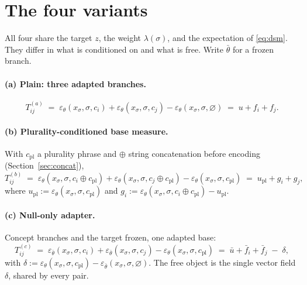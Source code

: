 \documentclass[11pt]{article}
\newcommand{\eps}{\varepsilon}
\newcommand{\epsth}{\eps_\theta}
\newcommand{\epsfr}{\eps_{\bar\theta}}
\newcommand{\xs}{x_\sigma}
\newcommand{\cnull}{\varnothing}
\newcommand{\cpl}{c_{\mathrm{pl}}}
\theoremstyle{plain}
\theoremstyle{remark}
\begin{document}
\section{The four variants}

All four share the target $z$, the weight $\lambda(\sigma)$, and the expectation of
\eqref{eq:dsm}. They differ in what is conditioned on and what is free. Write $\bar\theta$ for
a frozen branch.

\paragraph{(a) Plain: three adapted branches.}
\begin{equation}
  T^{(a)}_{ij} \;=\; \epsth(\xs,\sigma,c_i) + \epsth(\xs,\sigma,c_j) - \epsth(\xs,\sigma,\cnull)
  \;=\; u + f_i + f_j .
  \label{eq:va}
\end{equation}

\paragraph{(b) Plurality-conditioned base measure.}
With $\cpl$ a plurality phrase and $\oplus$ string concatenation before encoding
(Section~\ref{sec:concat}),
\begin{equation}
  T^{(b)}_{ij} \;=\; \epsth(\xs,\sigma,c_i \oplus \cpl) + \epsth(\xs,\sigma,c_j \oplus \cpl)
  - \epsth(\xs,\sigma,\cpl)
  \;=\; u_{\mathrm{pl}} + g_i + g_j ,
  \label{eq:vb}
\end{equation}
where $u_{\mathrm{pl}} := \epsth(\xs,\sigma,\cpl)$ and
$g_i := \epsth(\xs,\sigma,c_i \oplus \cpl) - u_{\mathrm{pl}}$.

\paragraph{(c) Null-only adapter.}
Concept branches and the target frozen, one adapted base:
\begin{equation}
  T^{(c)}_{ij} \;=\; \epsfr(\xs,\sigma,c_i) + \epsfr(\xs,\sigma,c_j) - \epsth(\xs,\sigma,\cpl)
  \;=\; \bar u + \bar f_i + \bar f_j \;-\; \delta ,
  \label{eq:vc}
\end{equation}
with $\delta := \epsth(\xs,\sigma,\cpl) - \epsfr(\xs,\sigma,\cnull)$.
The free object is the single vector field $\delta$, shared by every pair.
\end{document}
